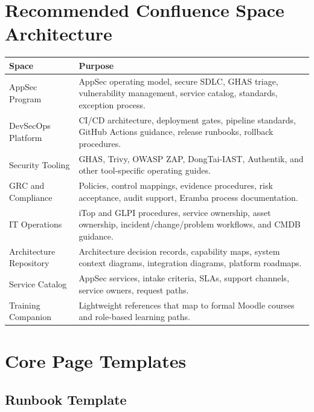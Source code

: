 \documentclass[10pt,letterpaper]{article}
\begin{document}
\section{Recommended Confluence Space Architecture}

\begin{longtable}{L{1.85in} L{4.9in}}
\toprule
\textbf{Space} & \textbf{Purpose} \\
\midrule
AppSec Program & AppSec operating model, secure SDLC, GHAS triage, vulnerability management, service catalog, standards, exception process. \\
DevSecOps Platform & CI/CD architecture, deployment gates, pipeline standards, GitHub Actions guidance, release runbooks, rollback procedures. \\
Security Tooling & GHAS, Trivy, OWASP ZAP, DongTai-IAST, Authentik, and other tool-specific operating guides. \\
GRC and Compliance & Policies, control mappings, evidence procedures, risk acceptance, audit support, Eramba process documentation. \\
IT Operations & iTop and GLPI procedures, service ownership, asset ownership, incident/change/problem workflows, and CMDB guidance. \\
Architecture Repository & Architecture decision records, capability maps, system context diagrams, integration diagrams, platform roadmaps. \\
Service Catalog & AppSec services, intake criteria, SLAs, support channels, service owners, request paths. \\
Training Companion & Lightweight references that map to formal Moodle courses and role-based learning paths. \\
\bottomrule
\end{longtable}

\section{Core Page Templates}

\subsection{Runbook Template}
\end{document}
